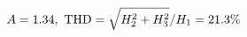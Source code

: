 \documentclass[preview]{standalone}
\begin{document}
\begin{align*}
\special{dvisvgm:raw <g id='unique000'>}A=1.34,\ \text{THD}=\sqrt{H_2^2+H_3^2}/H_1=21.3\%\special{dvisvgm:raw </g>}
\end{align*}
\end{document}
